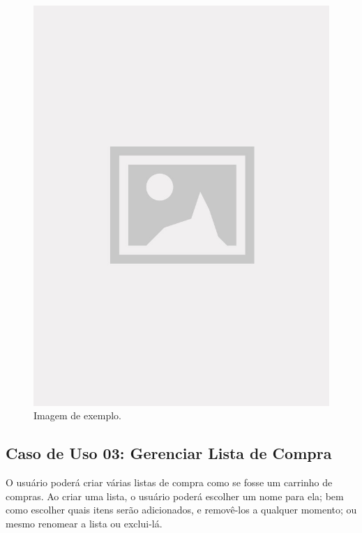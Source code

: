\begin{figure}[!htb]
\centering
\caption{Imagem de exemplo.}
\includegraphics[width=\linewidth]{figuras/placeholder.jpg}
\end{figure}

\subsection{Caso de Uso 03: Gerenciar Lista de Compra}

O usuário poderá criar várias listas de compra como se fosse um carrinho de compras. Ao criar uma lista, o usuário poderá escolher um nome para ela; bem como escolher quais itens serão adicionados, e removê-los a qualquer momento; ou mesmo renomear a lista ou exclui-lá.

